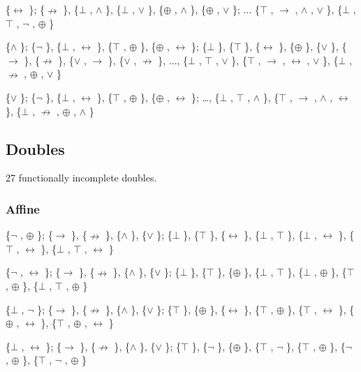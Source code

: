 \{$\leftrightarrow$ \}; \{$\nrightarrow$ \}, \{$\bot$ , $\land$ \}, \{$\bot$ , $\lor$ \}, \{$\oplus$ , $\land$ \}, \{$\oplus$ , $\lor$ \}; ... \{$\top$ , $\to$ , $\land$ ,
$\lor$ \}, \{$\bot$ , $\top$ , $\neg$ , $\oplus$ \}

\{$\land$ \}; \{$\neg$ \}, \{$\bot$ , $\leftrightarrow$ \}, \{$\top$ , $\oplus$ \}, \{$\oplus$ , $\leftrightarrow$ \}; \{$\bot$ \}, \{$\top$ \}, \{$\leftrightarrow$ \}, \{$\oplus$ \},
\{$\lor$ \}, \{$\to$ \}, \{$\nrightarrow$ \}, \{$\lor$ , $\to$ \}, \{$\lor$ , $\nrightarrow$ \}, ..., \{$\bot$ , $\top$ , $\lor$ \}, \{$\top$ , $\to$ , $\leftrightarrow$ ,
$\lor$ \}, \{$\bot$ , $\nrightarrow$ , $\oplus$ , $\lor$ \}

\{$\lor$ \}; \{$\neg$ \}, \{$\bot$ , $\leftrightarrow$ \}, \{$\top$ , $\oplus$ \}, \{$\oplus$ , $\leftrightarrow$ \}; \ldots, \{$\bot$ , $\top$ , $\land$ \}, \{$\top$ , $\to$ ,
$\land$ , $\leftrightarrow$ \}, \{$\bot$ , $\nrightarrow$ , $\oplus$ , $\land$ \}

\hypertarget{doubles-1}{%
\subsection{Doubles}\label{doubles-1}}

27 functionally incomplete doubles.

\hypertarget{affine}{%
\subsubsection{Affine}\label{affine}}

\{$\neg$ , $\oplus$ \}; \{$\to$ \}, \{$\nrightarrow$ \}, \{$\land$ \}, \{$\lor$ \}; \{$\bot$ \}, \{$\top$ \}, \{$\leftrightarrow$ \}, \{$\bot$ , $\top$ \},
\{$\bot$ , $\leftrightarrow$ \}, \{$\top$ , $\leftrightarrow$ \}, \{$\bot$ , $\top$ , $\leftrightarrow$ \}

\{$\neg$ , $\leftrightarrow$ \}; \{$\to$ \}, \{$\nrightarrow$ \}, \{$\land$ \}, \{$\lor$ \}; \{$\bot$ \}, \{$\top$ \}, \{$\oplus$ \}, \{$\bot$ , $\top$ \},
\{$\bot$ , $\oplus$ \}, \{$\top$ , $\oplus$ \}, \{$\bot$ , $\top$ , $\oplus$ \}

\{$\bot$ , $\neg$ \}; \{$\to$ \}, \{$\nrightarrow$ \}, \{$\land$ \}, \{$\lor$ \}; \{$\top$ \}, \{$\oplus$ \}, \{$\leftrightarrow$ \}, \{$\top$ , $\oplus$ \},
\{$\top$ , $\leftrightarrow$ \}, \{$\oplus$ , $\leftrightarrow$ \}, \{$\top$ , $\oplus$ , $\leftrightarrow$ \}

\{$\bot$ , $\leftrightarrow$ \}; \{$\to$ \}, \{$\nrightarrow$ \}, \{$\land$ \}, \{$\lor$ \}; \{$\top$ \}, \{$\neg$ \}, \{$\oplus$ \}, \{$\top$ , $\neg$ \},
\{$\top$ , $\oplus$ \}, \{$\neg$ , $\oplus$ \}, \{$\top$ , $\neg$ , $\oplus$ \}

